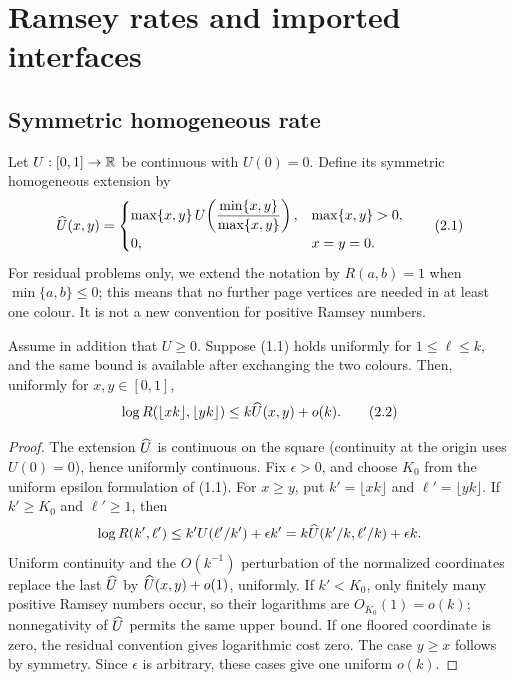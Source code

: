 \section{Ramsey rates and imported interfaces}\label{sec:framework}

\subsection{Symmetric homogeneous rate}

Let \(U:[0,1]\to\mathbb R\) be continuous with \(U(0)=0\).  Define its symmetric
homogeneous extension by
\[
 \widehat U(x,y)=
 \begin{cases}
 \max\{x,y\}\,U\!\left(\dfrac{\min\{x,y\}}{\max\{x,y\}}\right),
     &\max\{x,y\}>0,\\[2mm]
 0,&x=y=0.
 \end{cases}
 \tag{2.1}
\]
For residual problems only, we extend the notation by
\(R(a,b)=1\) when \(\min\{a,b\}\le0\); this means that no further page
vertices are needed in at least one colour.  It is not a new convention for
positive Ramsey numbers.

\begin{lemma}\label{lem:homogeneous}
Assume in addition that \(U\ge0\).  Suppose (1.1) holds uniformly for
\(1\le\ell\le k\), and the same bound is
available after exchanging the two colours.  Then, uniformly for
\(x,y\in[0,1]\),
\[
 \log R(\lfloor xk\rfloor,\lfloor yk\rfloor)
 \le k\widehat U(x,y)+o(k).
 \tag{2.2}
\]
\end{lemma}

\begin{proof}
The extension \(\widehat U\) is continuous on the square (continuity at the
origin uses \(U(0)=0\)), hence uniformly continuous.  Fix
\(\epsilon>0\), and choose \(K_0\) from the uniform epsilon formulation of
(1.1).  For \(x\ge y\), put \(k'=\lfloor xk\rfloor\) and
\(\ell'=\lfloor yk\rfloor\).  If \(k'\ge K_0\) and \(\ell'\ge1\), then
\[
 \log R(k',\ell')\le
 k' U(\ell'/k')+\epsilon k'
 =k\widehat U(k'/k,\ell'/k)+\epsilon k.
\]
Uniform continuity and the \(O(k^{-1})\) perturbation of the normalized
coordinates replace the last \(\widehat U\) by \(\widehat U(x,y)+o(1)\), uniformly.
If \(k'<K_0\), only finitely many positive Ramsey numbers occur, so their
logarithms are \(O_{K_0}(1)=o(k)\); nonnegativity of \(\widehat U\) permits the
same upper bound.  If one floored coordinate is zero, the residual convention
gives logarithmic cost zero.  The case \(y\ge x\) follows by symmetry.  Since
\(\epsilon\) is arbitrary, these cases give one uniform \(o(k)\).
\end{proof}


